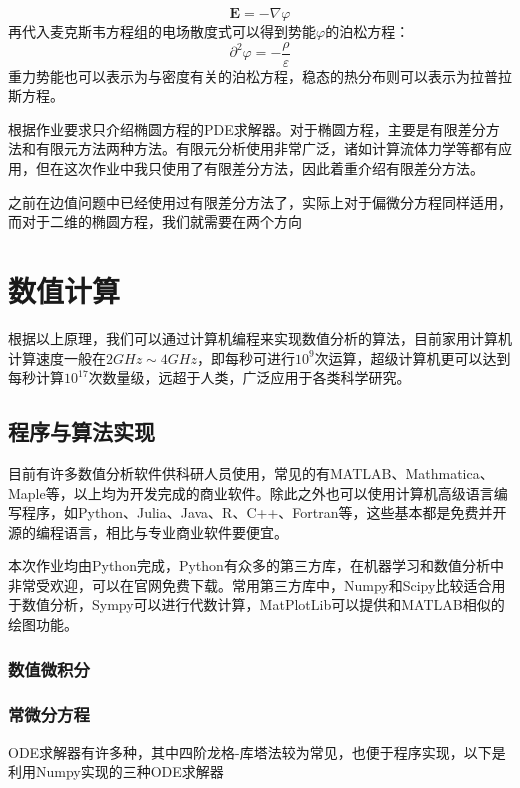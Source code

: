 \documentclass[UTF8,a4paper,10pt]{ctexart}
\begin{document}
\begin{multicols}{2}
            \begin{equation}
                \bm{E} = -\nabla\varphi
            \end{equation}
            再代入麦克斯韦方程组的电场散度式可以得到势能$\varphi$的泊松方程：
            \begin{equation}
                \partial^2\varphi = -\frac{\rho}{\varepsilon}
            \end{equation}
            重力势能也可以表示为与密度有关的泊松方程，稳态的热分布则可以表示为拉普拉斯方程。\par
            根据作业要求只介绍椭圆方程的PDE求解器。对于椭圆方程，主要是有限差分方法和有限元方法两种方法。有限元分析使用非常广泛，诸如计算流体力学等都有应用，但在这次作业中我只使用了有限差分方法，因此着重介绍有限差分方法。\par
            之前在边值问题中已经使用过有限差分方法了，实际上对于偏微分方程同样适用，而对于二维的椭圆方程，我们就需要在两个方向\par
    \section{数值计算}
    根据以上原理，我们可以通过计算机编程来实现数值分析的算法，目前家用计算机计算速度一般在$2GHz\sim4GHz$，即每秒可进行$10^9$次运算，超级计算机更可以达到每秒计算$10^{17}$次数量级，远超于人类，广泛应用于各类科学研究。
        \subsection{程序与算法实现}
        目前有许多数值分析软件供科研人员使用，常见的有MATLAB、Mathmatica、Maple等，以上均为开发完成的商业软件。除此之外也可以使用计算机高级语言编写程序，如Python、Julia、Java、R、C++、Fortran等，这些基本都是免费并开源的编程语言，相比与专业商业软件要便宜。\par
        本次作业均由Python完成，Python有众多的第三方库，在机器学习和数值分析中非常受欢迎，可以在官网免费下载。常用第三方库中，Numpy和Scipy比较适合用于数值分析，Sympy可以进行代数计算，MatPlotLib可以提供和MATLAB相似的绘图功能。\par
            \subsubsection{数值微积分}
            \subsubsection{常微分方程}
            ODE求解器有许多种，其中四阶龙格-库塔法较为常见，也便于程序实现，以下是利用Numpy实现的三种ODE求解器
            

\end{multicols}
\end{document}
